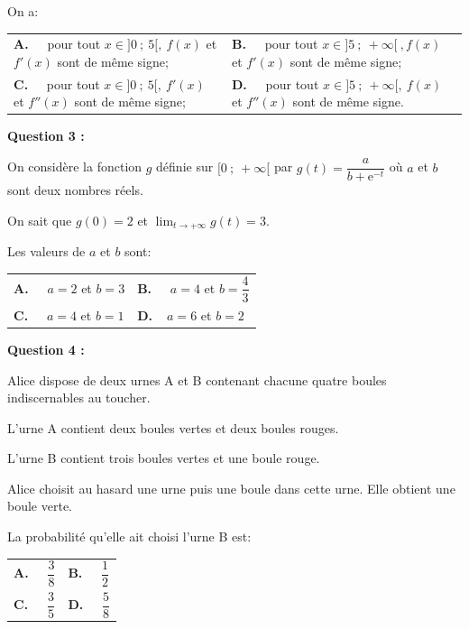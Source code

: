 \documentclass[10pt]{article}
\begin{document}
On a:

\begin{center}
\begin{tabularx}{\linewidth}{X X}
\textbf{A.~~} pour tout $x \in  ]0~;~5[,\:f(x)$ et $f'(x)$ sont de même signe;&
\textbf{B.~~} pour tout $x \in ]5~;~+\infty[\:, f(x)$ et $f'(x)$ sont de même signe;\\
\textbf{C.~~} pour tout $x \in ]0~;~5[,\: f'(x)$ et $f''(x)$ sont de même signe;&
\textbf{D.~~} pour tout $x \in  ]5~;~+\infty[,\: f(x)$ et $f''(x)$ sont de même signe.
\end{tabularx}
\end{center}

\medskip

\textbf{Question 3 :}

\medskip

On considère la fonction $g$ définie sur $[0~;~ +\infty[$ par $g(t) = \dfrac{a}{b + \text{e}^{-t}}$ où $a$ et $b$ sont deux nombres réels.

On sait que $g(0) = 2$ et $\displaystyle\lim_{t \to + \infty}  g(t) = 3$. 

Les valeurs de $a$ et $b$ sont:

\begin{center}
\begin{tabularx}{\linewidth}{X X}
\textbf{A.~~} $a = 2$ et $b = 3$&\textbf{B.~~} $a = 4$ et $b = \dfrac43$\\
\textbf{C.~~} $a = 4$ et $b = 1$&\textbf{D.~~}$a = 6$ et $b = 2$
\end{tabularx}
\end{center}

\medskip

\textbf{Question 4 :}

\medskip

Alice dispose de deux urnes A et B contenant chacune quatre boules indiscernables au toucher.

L'urne A contient deux boules vertes et deux boules rouges.

L'urne B contient trois boules vertes et une boule rouge.

Alice choisit au hasard une urne puis une boule dans cette urne. Elle obtient une boule verte.

La probabilité qu'elle ait choisi l'urne B est:

\begin{center}
\renewcommand\arraystretch{2.1}
\begin{tabularx}{\linewidth}{X X}
\textbf{A.~~} $\dfrac38$&\textbf{B.~~} $\dfrac12$\\
\textbf{C.~~} $\dfrac35$&\textbf{D.~~} $\dfrac58$
\end{tabularx}
\end{center}
\renewcommand\arraystretch{1}
\end{document}
